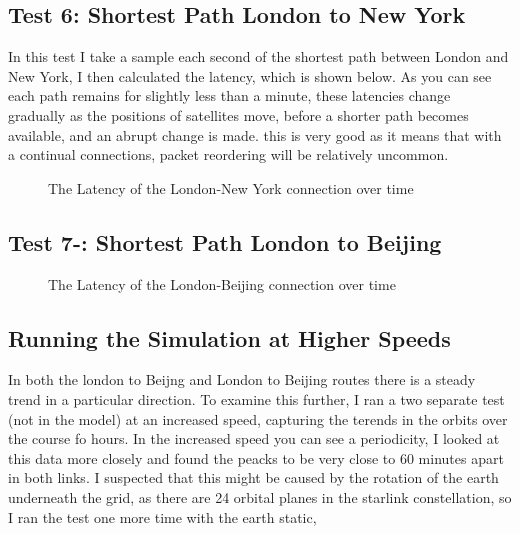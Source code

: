 \documentclass[12pt]{article}
\begin{document}
\subsection{Test 6: Shortest Path London to New York}

In this test I take a sample each second of the shortest path between London and New York, I then calculated the latency, which is shown below. As you can see each path remains for slightly less than a minute, these latencies change gradually as the positions of satellites move, before a shorter path becomes available, and an abrupt change is made. this is very good as it means that with a continual connections, packet reordering will be relatively uncommon.



\begin{figure}
\label{fig:Latency London To New York}
\caption{The Latency of the London-New York connection over time}
\end{figure}

\subsection{Test 7-: Shortest Path London to Beijing}

\begin{figure}
\label{fig:Latency London To Beijing}
\caption{The Latency of the London-Beijing connection over time}
\end{figure}

\subsection{Running the Simulation at Higher Speeds}

In both the london to Beijng and London to Beijing routes there is a steady trend in a particular direction. To examine this further, I ran a two separate test (not in the model) at an increased speed, capturing the terends in the orbits over the course fo hours. In the increased speed you can see a periodicity, I looked at this data more closely and found the peacks to be very close to 60 minutes apart in both links. I suspected that this might be caused by the rotation of the earth underneath the grid, as there are 24 orbital planes in the starlink constellation, so I ran the test one more time with the earth static, %
\end{document}
